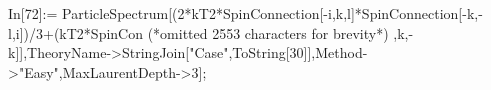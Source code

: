 In[72]:= ParticleSpectrum[(2*kT2*SpinConnection[-i,k,l]*SpinConnection[-k,-l,i])/3+(kT2*SpinCon (*omitted 2553 characters for brevity*) ,k,-k]],TheoryName->StringJoin["Case",ToString[30]],Method->"Easy",MaxLaurentDepth->3];